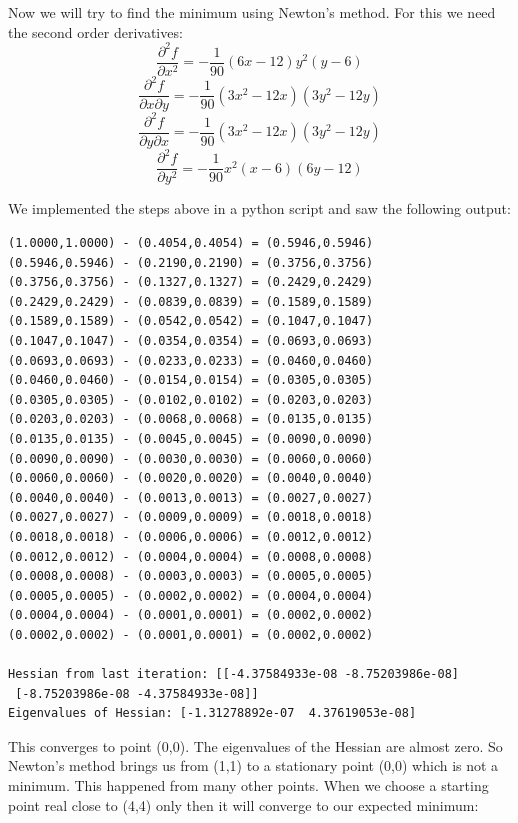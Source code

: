 \documentclass[journal]{IEEEtran}
\begin{document}
Now we will try to find the minimum using Newton's method. For this we need the second order derivatives:\\
\[
\frac{\partial^2 f}{\partial x^2} = - \frac{1}{90}(6x-12)y^2(y-6)
\]
\[
\frac{\partial^2 f}{\partial x \partial y} = - \frac{1}{90}(3x^2-12x)(3y^2-12y)
\]
\[
\frac{\partial^2 f}{\partial y \partial x} = - \frac{1}{90}(3x^2-12x)(3y^2-12y)
\]
\[
\frac{\partial^2 f}{\partial y^2} = - \frac{1}{90}x^2(x-6)(6y-12)
\]

We implemented the steps above in a python script and saw the following output:
{\footnotesize
\begin{verbatim}
(1.0000,1.0000) - (0.4054,0.4054) = (0.5946,0.5946)
(0.5946,0.5946) - (0.2190,0.2190) = (0.3756,0.3756)
(0.3756,0.3756) - (0.1327,0.1327) = (0.2429,0.2429)
(0.2429,0.2429) - (0.0839,0.0839) = (0.1589,0.1589)
(0.1589,0.1589) - (0.0542,0.0542) = (0.1047,0.1047)
(0.1047,0.1047) - (0.0354,0.0354) = (0.0693,0.0693)
(0.0693,0.0693) - (0.0233,0.0233) = (0.0460,0.0460)
(0.0460,0.0460) - (0.0154,0.0154) = (0.0305,0.0305)
(0.0305,0.0305) - (0.0102,0.0102) = (0.0203,0.0203)
(0.0203,0.0203) - (0.0068,0.0068) = (0.0135,0.0135)
(0.0135,0.0135) - (0.0045,0.0045) = (0.0090,0.0090)
(0.0090,0.0090) - (0.0030,0.0030) = (0.0060,0.0060)
(0.0060,0.0060) - (0.0020,0.0020) = (0.0040,0.0040)
(0.0040,0.0040) - (0.0013,0.0013) = (0.0027,0.0027)
(0.0027,0.0027) - (0.0009,0.0009) = (0.0018,0.0018)
(0.0018,0.0018) - (0.0006,0.0006) = (0.0012,0.0012)
(0.0012,0.0012) - (0.0004,0.0004) = (0.0008,0.0008)
(0.0008,0.0008) - (0.0003,0.0003) = (0.0005,0.0005)
(0.0005,0.0005) - (0.0002,0.0002) = (0.0004,0.0004)
(0.0004,0.0004) - (0.0001,0.0001) = (0.0002,0.0002)
(0.0002,0.0002) - (0.0001,0.0001) = (0.0002,0.0002)

Hessian from last iteration: [[-4.37584933e-08 -8.75203986e-08]
 [-8.75203986e-08 -4.37584933e-08]]
Eigenvalues of Hessian: [-1.31278892e-07  4.37619053e-08]
\end{verbatim}
}
This converges to point (0,0). The eigenvalues of the Hessian are almost zero.
So Newton's method brings us from (1,1) to a stationary point (0,0) which is not a minimum.
This happened from many other points. When we choose a starting point real close to (4,4) only then it will converge to our expected minimum:
\end{document}

